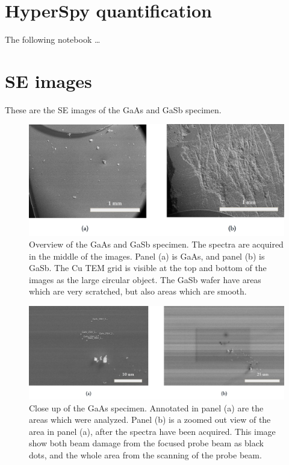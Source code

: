 \chapter{HyperSpy quantification}
\label{appendix:HSquant}

The following notebook \dots
% 



\chapter{SE images}
\label{appendix:SE_images}

These are the SE images of the GaAs and GaSb specimen.


\begin{figure}[htbp]
    \centering
    \includegraphics[width=.95\textwidth]{figures/SE_images/Overview_GaAs_GaSb.jpg}
    \caption{
        Overview of the GaAs and GaSb specimen.
        The spectra are acquired in the middle of the images.
        Panel (a) is GaAs, and panel (b) is GaSb.
        The Cu TEM grid is visible at the top and bottom of the images as the large circular object.
        The GaSb wafer have areas which are very scratched, but also areas which are smooth.
        }
    \label{fig:SE_images:Overview_GaAs_GaSb}
\end{figure}

\begin{figure}[htbp]
    \centering
    \includegraphics[width=.95\textwidth]{figures/SE_images/GaAs_close.jpg}
    \caption{
        Close up of the GaAs specimen.
        Annotated in panel (a) are the areas which were analyzed.
        Panel (b) is a zoomed out view of the area in panel (a), after the spectra have been acquired.
        This image show both beam damage from the focused probe beam as black dots, and the whole area from the scanning of the probe beam.
        }
    \label{fig:SE_images:GaAs}
\end{figure}


